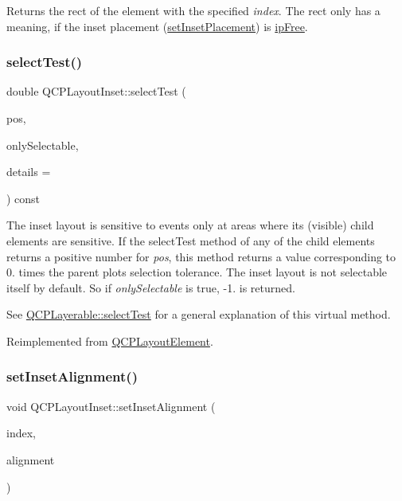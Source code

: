 Returns the rect of the element with the specified {\itshape index}. The rect only has a meaning, if the inset placement (\hyperlink{classQCPLayoutInset_a63298830744d5d8c5345511c00fd2144}{set\+Inset\+Placement}) is \hyperlink{classQCPLayoutInset_a8b9e17d9a2768293d2a7d72f5e298192aa4802986ea2cea457f932b115acba59e}{ip\+Free}. \mbox{\label{classQCPLayoutInset_a2eeef7ea1b8340e7c7c2e2fc229df5ea}} 
\subsubsection{\texorpdfstring{select\+Test()}{selectTest()}}
{\footnotesize\ttfamily double Q\+C\+P\+Layout\+Inset\+::select\+Test (\begin{DoxyParamCaption}\item[{const Q\+PointF \&}]{pos,  }\item[{bool}]{only\+Selectable,  }\item[{Q\+Variant $\ast$}]{details = {} }\end{DoxyParamCaption}) const\hspace{0.3cm}{\ttfamily [virtual]}}

The inset layout is sensitive to events only at areas where its (visible) child elements are sensitive. If the select\+Test method of any of the child elements returns a positive number for {\itshape pos}, this method returns a value corresponding to 0. times the parent plot\textquotesingle{}s selection tolerance. The inset layout is not selectable itself by default. So if {\itshape only\+Selectable} is true, -\/1. is returned.

See \hyperlink{classQCPLayerable_a04db8351fefd44cfdb77958e75c6288e}{Q\+C\+P\+Layerable\+::select\+Test} for a general explanation of this virtual method. 

Reimplemented from \hyperlink{classQCPLayoutElement_ae97f483cccedadbf18ea4525ef240ee4}{Q\+C\+P\+Layout\+Element}.

\mbox{\label{classQCPLayoutInset_a62882a4f9ad58bb0f53da12fde022abe}} 
\subsubsection{\texorpdfstring{set\+Inset\+Alignment()}{setInsetAlignment()}}
{\footnotesize\ttfamily void Q\+C\+P\+Layout\+Inset\+::set\+Inset\+Alignment (\begin{DoxyParamCaption}\item[{int}]{index,  }\item[{Qt\+::\+Alignment}]{alignment }\end{DoxyParamCaption})}

